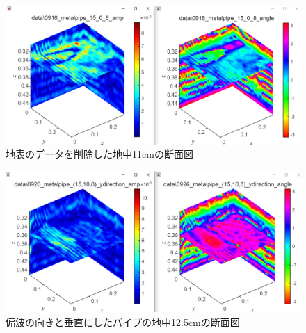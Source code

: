 \documentclass[12pt,a4paper]{jsreport}
\begin{document}
      \begin{figure}[h]
        \begin{center}
         \includegraphics[width=14cm]{dataimage/matlab/0918_metalpipe_(15,0,8)_xdirection_d=34cm_delete_unnecessary.png}
        \caption{地表のデータを削除した地中11cmの断面図}\label{地表のデータを削除した地中11cmの断面図}
        \end{center}
        \end{figure}

        \begin{figure}[h]
          \begin{center}
           \includegraphics[width=14cm]{dataimage/matlab/0918_metalpipe_(15,10,8)_ydirection_d=35cm_delete_unnecessary.png}
          \caption{偏波の向きと垂直にしたパイプの地中12.5cmの断面図}\label{偏波の向きと垂直にしたパイプの地中12.5cmの断面図}
          \end{center}
          \end{figure}

\end{document}
